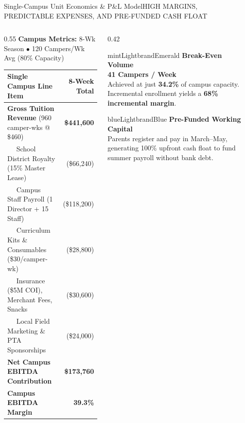 \documentclass[aspectratio=169,9pt]{beamer}
\begin{document}
\begin{frame}{Single-Campus Unit Economics \& P\&L Model}{HIGH MARGINS, PREDICTABLE EXPENSES, AND PRE-FUNDED CASH FLOAT}

\begin{columns}[T]
  \begin{column}{0.55\textwidth}
    \scriptsize
    \textbf{Campus Metrics:} 8-Wk Season $\bullet$ 120 Campers/Wk Avg (80\% Capacity)
    \vskip2pt
    \begin{tabularx}{\textwidth}{Xr}
      \toprule
      \textbf{Single Campus Line Item} & \textbf{8-Week Total} \\
      \midrule
      \textbf{Gross Tuition Revenue} (960 camper-wks @ \$460) & \textbf{\$441,600} \\
      \midrule
      $\quad$ School District Royalty (15\% Master Lease) & (\$66,240) \\
      $\quad$ Campus Staff Payroll (1 Director + 15 Staff) & (\$118,200) \\
      $\quad$ Curriculum Kits \& Consumables (\$30/camper-wk) & (\$28,800) \\
      $\quad$ Insurance (\$5M COI), Merchant Fees, Snacks & (\$30,600) \\
      $\quad$ Local Field Marketing \& PTA Sponsorships & (\$24,000) \\
      \midrule
      \textbf{Net Campus EBITDA Contribution} & \textbf{\$173,760} \\
      \textbf{Campus EBITDA Margin} & \textbf{39.3\%} \\
      \bottomrule
    \end{tabularx}
  \end{column}

  \begin{column}{0.42\textwidth}
    \begin{execbox}{mintLight}{brandEmerald}
      \textcolor{brandEmerald}{\textbf{\tiny Break-Even Volume}} \\[1pt]
      \textcolor{brandNavy}{\textbf{\normalsize 41 Campers / Week}} \\[1pt]
      \tiny
      Achieved at just \textbf{34.2\%} of campus capacity. Incremental enrollment yields a \textbf{68\% incremental margin}.
    \end{execbox}

    \vskip3pt
    \begin{execbox}{blueLight}{brandBlue}
      \textcolor{brandBlue}{\textbf{\tiny Pre-Funded Working Capital}} \\[1pt]
      \tiny
      Parents register and pay in March--May, generating 100\% upfront cash float to fund summer payroll without bank debt.
    \end{execbox}
  \end{column}
\end{columns}

\end{frame}
\end{document}
